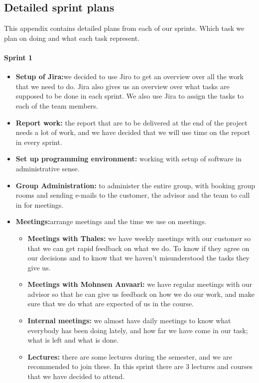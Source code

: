 


\subsection{Detailed sprint plans}
This appendix contains detailed plans from each of our sprints. Which task we plan on doing and what each task represent.

\paragraph{Sprint 1}

\begin{itemize}
\item{}\textbf{Setup of Jira:}we decided to use Jiro to get an overview over all the work that we need to do. Jira also gives us an overview over what tasks are supposed to be done in each sprint. We also use Jira to assign the tasks to each of the team members.
\item{}\textbf{Report work:} the report that are to be delivered at the end of the project needs a lot of work, and we have decided that we will use time on the report in every sprint.
\item{}\textbf{Set up programming environment:} working with setup of software in administrative sense.
\item{}\textbf{Group Administration:} to administer the entire group, with booking group rooms and sending e-mails to the customer, the advisor and the team to call in for meetings.
\item{}\textbf{Meetings:}arrange meetings and the time we use on meetings.
\begin{itemize}
\item{}\textbf{Meetings with Thales:} we have weekly meetings with our customer so that we can get rapid feedback on what we do. To know if they agree on our decisions and to know that we haven’t misunderstood the tasks they give us.
\item{}\textbf{Meetings with Mohnsen Anvaari:} we have regular meetings with our advisor so that he can give us feedback on how we do our work, and make sure that we do what are expected of us in the course.
\item{}\textbf{Internal meetings:} we almost have daily meetings to know what everybody has been doing lately, and how far we have come in our task; what is left and what is done.
\item{}\textbf{Lectures:} there are some lectures during the semester, and we are recommended to join these. In this sprint there are 3 lectures and courses that we have decided to attend.

\end{itemize}
\end{itemize}
